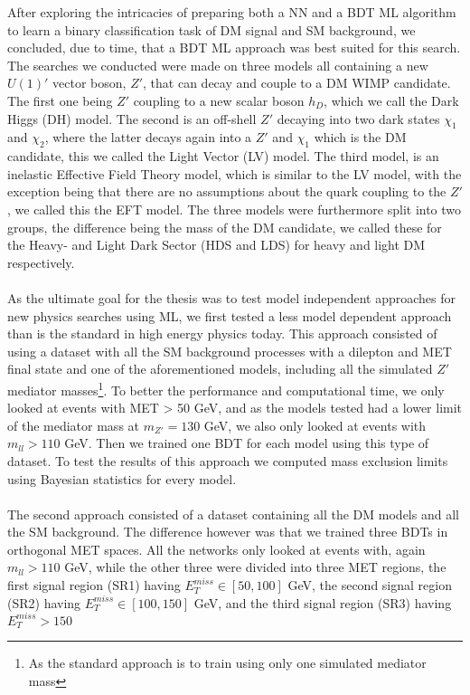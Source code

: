\documentclass[12pt, a4paper]{book}
\begin{document}
After exploring the intricacies of preparing both a NN and a BDT ML algorithm to learn a binary classification task of DM signal and SM background, we concluded, due to time, that a BDT ML approach was 
best suited for this search. The searches we conducted were made on three models all containing a new $U(1)'$ vector boson, $Z'$, that can decay and couple to a DM WIMP candidate. The first one being $Z'$ coupling to a new scalar boson $h_D$, 
which we call the Dark Higgs (DH) model. The second is an off-shell $Z'$ decaying into two dark states $\chi_1$ and $\chi_2$, where the latter decays again into a $Z'$ and $\chi_1$ which is the DM candidate, this we called the Light Vector (LV) model. 
The third model, is an inelastic Effective Field Theory model, which is similar to the LV model, with the exception being that there are no assumptions about the quark coupling to the $Z'$, we called this the EFT model. The three models were furthermore 
split into two groups, the difference being the mass of the DM candidate, we called these for the Heavy- and Light Dark Sector (HDS and LDS) for heavy and light DM respectively.\\
\\As the ultimate goal for the thesis was to test model independent approaches for new physics searches using ML, we first tested a less model dependent approach than is the standard in high energy physics today. This approach consisted of using a dataset 
with all the SM background processes with a dilepton and MET final state and one of the aforementioned models, including all the simulated $Z'$ mediator masses\footnote{As the standard approach is to train using only one simulated mediator mass}. 
To better the performance and computational time, we only looked at events with MET > 50 GeV, and as the models tested had a lower limit of the mediator mass at $m_{Z'}=130$ GeV, we also only looked at events with $m_{ll}>110$ GeV. Then we trained one BDT 
for each model using this type of dataset. To test the results of this approach we computed mass exclusion limits using Bayesian statistics for every model.\\
\\The second approach consisted of a dataset containing all the DM models and all the SM background. The difference however was that we trained three BDTs in orthogonal MET spaces. All the networks only looked at events with, again $m_{ll}>110$ 
GeV, while the other three were divided into three MET regions, the first signal region (SR1) having $E_T^{miss}\in[50,100]$ GeV, the second signal region (SR2) having $E_T^{miss}\in[100,150]$ GeV, and the third signal region (SR3) having $E_T^{miss}>150$ 
\end{document}

